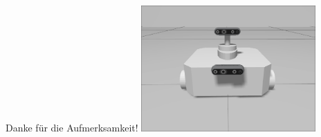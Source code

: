 \documentclass{beamer}
\begin{document}
\begin{frame}{}
	\centering
	\Large{Danke für die Aufmerksamkeit!}
	\vfill
	\includegraphics[width=0.5\textwidth]{Graphics/tb.png}
\end{frame}

\printbibliography
\end{document}
